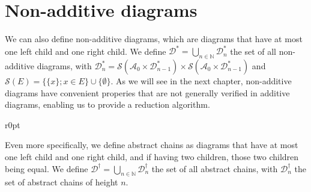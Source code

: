 \section{Non-additive diagrams}

We can also define non-additive diagrams, which are diagrams that have at most one left child and one right child. We define $\mathcal{D}^* = \bigcup_{n \in \mathbb{N}} \mathcal{D}^*_n$ the set of all non-additive diagrams, with $\mathcal{D}^*_n = \mathscr{S}(\mathcal{A}_0 \times \mathcal{D}^*_{n-1}) \times \mathscr{S}(\mathcal{A}_0 \times \mathcal{D}^*_{n-1})$ and $\mathscr{S}(E) = \{ \{x\} ; x \in E\} \cup \{\emptyset\}$. As we will see in the next chapter, non-additive diagrams have convenient properies that are not generally verified in additive diagrams, enabling us to provide a reduction algorithm.

\begin{wrapfigure}{r}{0pt}
\end{wrapfigure}

Even more specifically, we define abstract chains as diagrams that have at most one left child and one right child, and if having two children, those two children being equal. We define $\mathcal{D}^{\dagger} = \bigcup_{n \in \mathbb{N}} \mathcal{D}^{\dagger}_n$ the set of all abstract chains, with $\mathcal{D}^{\dagger}_n$ the set of abstract chains of height $n$.
